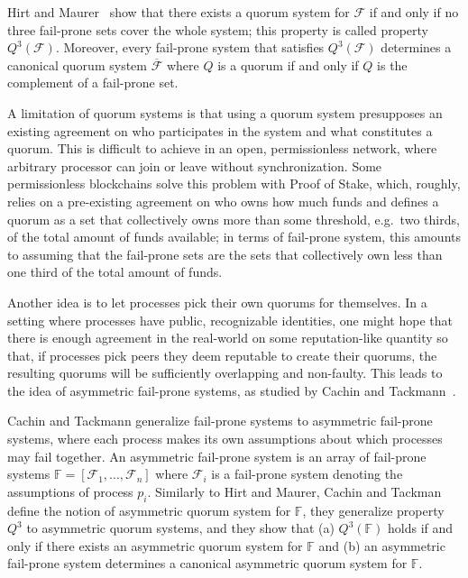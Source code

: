 \documentclass[11pt]{article}
\begin{document}
Hirt and Maurer~\cite{hirtPlayerSimulationGeneral2000} show that there exists a quorum system for $\mathcal{F}$ if and only if no three fail-prone sets cover the whole system; this property is called property $Q^3(\mathcal{F})$. Moreover, every fail-prone system that satisfies $Q^3(\mathcal{F})$ determines a canonical quorum system $\overline{\mathcal{F}}$ where $Q$ is a quorum if and only if $Q$ is the complement of a fail-prone set. %

A limitation of quorum systems is that using a quorum system presupposes an existing agreement on who participates in the system and what constitutes a quorum.
This is difficult to achieve in an open, permissionless network, where arbitrary processor can join or leave without synchronization.
Some permissionless blockchains solve this problem with Proof of Stake, which, roughly, relies on a pre-existing agreement on who owns how much funds and defines a quorum as a set that collectively owns more than some threshold, e.g.\ two thirds, of the total amount of funds available; in terms of fail-prone system, this amounts to assuming that the fail-prone sets are the sets that collectively own less than one third of the total amount of funds.

Another idea is to let processes pick their own quorums for themselves. In a setting where processes have public, recognizable identities, one might hope that there is enough agreement in the real-world on some reputation-like quantity so that, if processes pick peers they deem reputable to create their quorums, the resulting quorums will be sufficiently overlapping and non-faulty. This leads to the idea of asymmetric fail-prone systems, as studied by Cachin and Tackmann~\cite{cachinAsymmetricDistributedTrust2019}.

Cachin and Tackmann generalize fail-prone systems to asymmetric fail-prone systems, where each process makes its own assumptions about which processes may fail together.
An asymmetric fail-prone system is an array of fail-prone systems $\mathbb{F}=\left[\mathcal{F}_1,...,\mathcal{F}_n\right]$ where $\mathcal{F}_i$ is a fail-prone system denoting the assumptions of process $p_i$.  Similarly to Hirt and Maurer, Cachin and Tackman define the notion of asymmetric quorum system for $\mathbb{F}$, they generalize property $Q^3$ to asymmetric quorum systems, and they show that (a) $Q^3(\mathbb{F})$ holds if and only if there exists an asymmetric quorum system for $\mathbb{F}$ and (b) an asymmetric fail-prone system determines a canonical asymmetric quorum system for $\mathbb{F}$.
\end{document}

